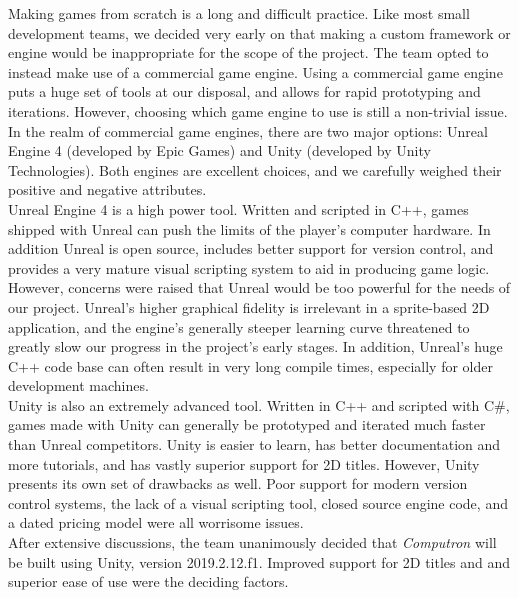 Making games from scratch is a long and difficult practice. Like most small development 
teams, we decided very early on that making a custom framework or engine would be 
inappropriate for the scope of the project. The team opted to instead make use of a 
commercial game engine. Using a commercial game engine puts a huge set of tools at 
our disposal, and allows for rapid prototyping and iterations. However, choosing which 
game engine to use is still a non-trivial issue. In the realm of commercial game engines, 
there are two major options: Unreal Engine 4 (developed by Epic Games) and Unity 
(developed by Unity Technologies). Both engines are excellent choices, and we carefully 
weighed their positive and negative attributes.\\

Unreal Engine 4 is a high power tool. Written and scripted in C++, games shipped with 
Unreal can push the limits of the player's computer hardware. In addition Unreal is open 
source, includes better support for version control, and provides a very mature visual 
scripting system to aid in producing game logic. However, concerns were raised that 
Unreal would be too powerful for the needs of our project. Unreal's higher graphical 
fidelity is irrelevant in a sprite-based 2D application, and the engine's generally steeper 
learning curve threatened to greatly slow our progress in the project's early stages. In 
addition, Unreal's huge C++ code base can often result in very long compile times, 
especially for older development machines.\\

Unity is also an extremely advanced tool. Written in C++ and scripted with C\#, games 
made with Unity can generally be prototyped and iterated much faster than Unreal 
competitors. Unity is easier to learn, has better documentation and more tutorials, and 
has vastly superior support for 2D titles. However, Unity presents its own set of drawbacks 
as well. Poor support for modern version control systems, the lack of a visual scripting tool, 
closed source engine code, and a dated pricing model were all worrisome issues.\\

After extensive discussions, the team unanimously decided that \textit{Computron} will be 
built using Unity, version 2019.2.12.f1. Improved support for 2D titles and and superior 
ease of use were the deciding factors.\\